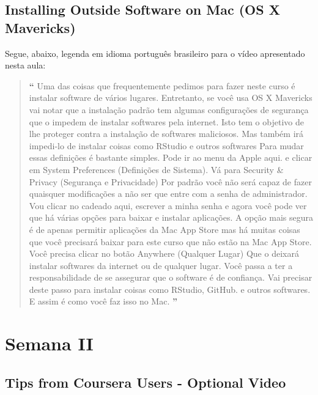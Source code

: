 \subsection{Installing Outside Software on Mac (OS X Mavericks)}

Segue, abaixo, legenda em idioma português brasileiro para o vídeo apresentado nesta aula:

\begin{quotation}%
\begin{small}
{\large\textbf{``}}%
Uma das coisas que frequentemente pedimos para fazer neste curso é instalar software de vários lugares. Entretanto, se você usa OS X Mavericks vai notar que a instalação padrão tem algumas configurações de segurança que o impedem de instalar softwares pela internet. Isto tem o objetivo de lhe proteger contra a instalação de softwares maliciosos. Mas também irá impedi-lo de instalar coisas como RStudio e outros softwares Para mudar essas definições é bastante simples. Pode ir ao menu da Apple aqui. e clicar em System Preferences (Definições de Sistema). Vá para Security \& Privacy (Segurança e Privacidade) Por padrão você não será capaz de fazer quaisquer modificações  a não ser que entre com a senha de administrador. Vou clicar no cadeado aqui, escrever a minha senha e agora você pode ver que há várias opções para baixar e instalar aplicações. A opção mais segura é de apenas permitir aplicações da Mac App Store mas há muitas coisas que você precisará baixar para este curso que não estão na Mac App Store. Você precisa clicar no botão Anywhere (Qualquer Lugar) Que o deixará instalar softwares da internet ou de qualquer lugar. Você passa a ter a responsabilidade de se assegurar que o software é de confiança. Vai precisar deste passo para instalar coisas como RStudio, GitHub. e outros softwares. E assim é como você faz isso no Mac.
{\large\textbf{''}}
\end{small}
\end{quotation}


\section{Semana II}

\subsection{Tips from Coursera Users - Optional Video}

